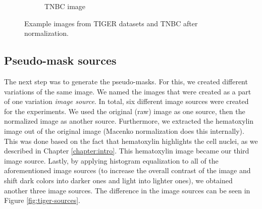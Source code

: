 \begin{figure}[H]
\begin{subfigure}[b]{0.32\textwidth}
    \caption{TNBC image}
    \label{fig:tnbc}
  \end{subfigure}

  \caption{Example images from TIGER datasets \cite{tiger_dataset} and TNBC \cite{TNBC-nuclei-seg-extended} after normalization.}
  \label{fig:mix-norm}
\end{figure}


\subsection{Pseudo-mask sources} 
The next step was to generate the pseudo-masks. For this, we created different variations of the same image. We named the images that were created as a part of one variation \textit{image source}. In total, six different image sources were created for the experiments. We used the original (raw) image as one source, then the normalized image as another source. Furthermore, we extracted the hematoxylin image out of the original image (Macenko normalization does this internally). This was done based on the fact that hematoxylin highlights the cell nuclei, as we described in Chapter \ref{chapter:intro}. This hematoxylin image became our third image source. Lastly, by applying histogram equalization to all of the aforementioned image sources (to increase the overall contrast of the image and shift dark colors into darker ones and light into lighter ones), we obtained another three image sources. The difference in the image sources can be seen in Figure \ref{fig:tiger-sources}. 

